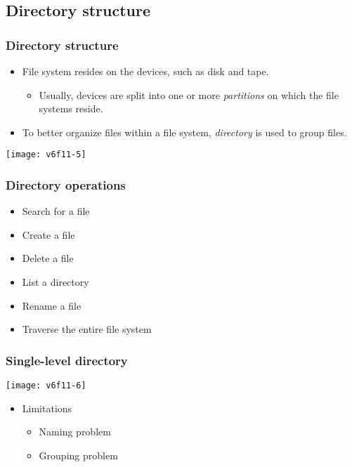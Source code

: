 \documentclass[CJKutf8,xcolor=pdftex,dvipsnames,table]{beamer}
\begin{document}
\begin{CJK*}{UTF8}{song}
  \subsection{Directory structure}

  \begin{frame}
    \frametitle{Directory structure} \pause
    \begin{itemize}
    \item File system resides on the devices, such as disk and tape. \pause
      \begin{itemize}
      \item Usually, devices are split into one or more \emph{partitions} on which the file systems reside. \pause
      \end{itemize}
    \item To better organize files within a file system, \emph{directory} is used to group files. \pause
    \end{itemize}
    \begin{center}
      \texttt{[image: v6f11-5]}
    \end{center}
  \end{frame}

  \begin{frame}
    \frametitle{Directory operations} \pause
    \begin{itemize}
    \item Search for a file \pause
    \item Create a file \pause
    \item Delete a file \pause
    \item List a directory \pause
    \item Rename a file \pause
    \item Traverse the entire file system
    \end{itemize}
  \end{frame}

  \begin{frame}
    \frametitle{Single-level directory} \pause
    \begin{center}
      \texttt{[image: v6f11-6]} \pause
    \end{center}
    \begin{itemize}
    \item Limitations \pause
      \begin{itemize}
      \item Naming problem \pause
      \item Grouping problem
      \end{itemize}
    \end{itemize}
  \end{frame}


\end{CJK*}
\end{document}
